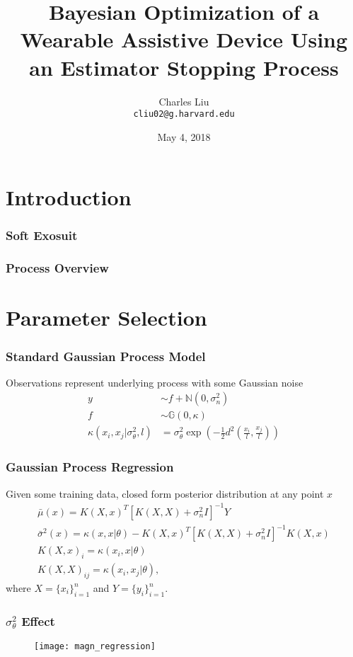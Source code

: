 \documentclass[compress, xcolor=pst]{beamer}
\title{Bayesian Optimization of a Wearable Assistive Device Using an Estimator Stopping Process}
\author[]{Charles Liu\\ \texttt{cliu02@g.harvard.edu}}
\institute{IACS, Harvard University}
\date{May 4, 2018}
\begin{document}
\frame{\titlepage}


\section{Introduction}
\begin{frame}
    \frametitle{\textbf{Soft Exosuit}}
\end{frame}

\begin{frame}
    \frametitle{\textbf{Process Overview}}
	\begin{figure}
		\centering
		\scalebox{.75}{}
	\end{figure}
\end{frame}

\section{Parameter Selection}
\begin{frame}
	\frametitle{\textbf{Standard Gaussian Process Model}}
	Observations represent underlying process with some Gaussian noise
	\begin{align*}
		y &\sim f + \mathbb{N}(0, \sigma_n^2)\\
		f &\sim \mathbb{G}(0, \kappa)\\
		\kappa(x_i, x_j \vert \sigma_\theta^2, l) &= \sigma_\theta^2 \exp(-\frac{1}{2}d^2(\frac{x_i}{l}, \frac{x_j}{l}))
	\end{align*}
\end{frame}

\begin{frame}
	\frametitle{\textbf{Gaussian Process Regression}}
	Given some training data, closed form posterior distribution at any point $x$
	\begin{gather*}
	  \bar{\mu}(x) = K(X, x)^T[K(X, X) + \sigma_n^2 I]^{-1}Y \\
	  \bar{\sigma}^2(x) = \kappa(x, x\vert \theta) - K(X, x)^T[K(X,X) + \sigma_n^2 I]^{-1}K(X,x) \\
	  K(X,x)_i = \kappa(x_i, x\vert \theta)\\
	  K(X,X)_{ij} = \kappa(x_i, x_j\vert \theta),
	\end{gather*}
	where $X = \{x_i\}_{i=1}^n$ and $Y = \{y_i\}_{i=1}^n$. 
\end{frame}

\begin{frame}
	\frametitle{\textbf{$\sigma_\theta^2$ Effect}}
	\begin{figure}
	\centering
	\texttt{[image: magn\_regression]}
	\end{figure}
\end{frame}
\end{document}
